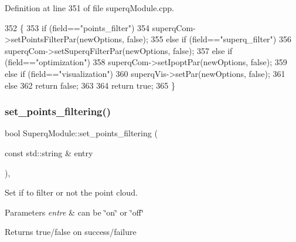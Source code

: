 Definition at line 351 of file superq\+Module.\+cpp.


\begin{DoxyCode}
352 \{
353     \textcolor{keywordflow}{if} (field==\textcolor{stringliteral}{"points\_filter"})
354         superqCom->setPointsFilterPar(newOptions, \textcolor{keyword}{false});
355     \textcolor{keywordflow}{else} \textcolor{keywordflow}{if} (field==\textcolor{stringliteral}{"superq\_filter"})
356         superqCom->setSuperqFilterPar(newOptions, \textcolor{keyword}{false});
357     \textcolor{keywordflow}{else} \textcolor{keywordflow}{if} (field==\textcolor{stringliteral}{"optimization"})
358         superqCom->setIpoptPar(newOptions, \textcolor{keyword}{false});
359     \textcolor{keywordflow}{else} \textcolor{keywordflow}{if} (field==\textcolor{stringliteral}{"visualization"})
360         superqVis->setPar(newOptions, \textcolor{keyword}{false});
361     \textcolor{keywordflow}{else}
362         \textcolor{keywordflow}{return} \textcolor{keyword}{false};
363 
364     \textcolor{keywordflow}{return} \textcolor{keyword}{true};
365 \}
\end{DoxyCode}
\mbox{\label{classSuperqModule_a408203d0119443fb61544f84dafff8a4}} 
\subsubsection{\texorpdfstring{set\+\_\+points\+\_\+filtering()}{set\_points\_filtering()}}
{\footnotesize\ttfamily bool Superq\+Module\+::set\+\_\+points\+\_\+filtering (\begin{DoxyParamCaption}\item[{const std\+::string \&}]{entry }\end{DoxyParamCaption})\hspace{0.3cm}{\ttfamily [protected]}, {\ttfamily [virtual]}}



Set if to filter or not the point cloud. 


\begin{DoxyParams}{Parameters}
{\em entre} & can be \char`\"{}on\char`\"{} or \char`\"{}off\char`\"{} \\
\hline
\end{DoxyParams}
\begin{DoxyReturn}{Returns}
true/false on success/failure 
\end{DoxyReturn}


